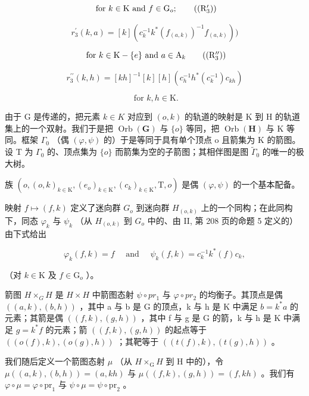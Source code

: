 \[
\text { for } k \in \mathrm{K} \text { and } f \in \mathrm{G} _ {o};\tag{\((\mathrm{R}_{3}^{\prime})\)}
\]

\[
r _ {3} ^ {\prime} (k, a) = [ k ] (c _ {k} ^ {- 1} k ^ {*} (f _ {(a, k)}) ^ {- 1} f _ {(a, k)}))
\]

\[
\text { for } k \in \mathrm{K} - \{e \} \text { and } a \in \mathrm{A} _{k}\tag{\((\mathrm{R}_{3}^{\prime\prime})\)}
\]

\[
r _ {3} ^ {\prime \prime} (k, h) = [ k h ] ^ {- 1} [ k ] [ h ] (c _ {h} ^ {- 1} h ^ {*} (c _ {k} ^ {- 1}) c _ {k h})
\]

\[
\text { for } k,h \in \mathrm{K}.
\]

由于 G 是传递的，把元素 \(k \in K\) 对应到 \((o, k)\) 的轨道的映射是 K 到 H 的轨道集上的一个双射。我们于是把 \(\operatorname{Orb}(\mathbf{G})\) 与 \(\{o\}\) 等同，把 \(\operatorname{Orb}(\mathbf{H})\) 与 K 等同。框架 \(\Gamma_{0}\) （偶 \((\varphi, \psi)\) 的）于是等同于具有单个顶点 o 且箭集为 K 的箭图。设 T 为 \(\Gamma_{0}\) 的、顶点集为 \(\{o\}\) 而箭集为空的子箭图；其相伴图是图 \(\widetilde{\Gamma}_{0}\) 的唯一的极大树。

族 \((o,(o,k)_{k\in \mathrm{K}},(e_o)_{k\in \mathrm{K}},(c_k)_{k\in \mathrm{K}},\mathrm{T},o)\) 是偶 \((\varphi ,\psi)\) 的一个基本配备。

映射 \(f \mapsto (f, k)\) 定义了迷向群 \(G_o\) 到迷向群 \(H_{(o,k)}\) 上的一个同构；在此同构下，同态 \(\varphi_k\) 与 \(\psi_k\) （从 \(H_{(o,k)}\) 到 \(G_o\) 中的、由 II, 第 208 页的命题 5 定义的）由下式给出

\[
\varphi_ {k} (f, k) = f \quad \text { and } \quad \psi_ {k} (f, k) = c _ {k} ^ {- 1} k ^ {*} (f) c _ {k},\tag{3}
\]

（对 \(k\in \mathrm{K}\) 及 \(f\in \mathrm{G}_o\) ）。

箭图 \(H \times_{G} H\) 是 \(H \times H\) 中箭图态射 \(\psi \circ pr_{1}\) 与 \(\varphi \circ pr_{2}\) 的均衡子。其顶点是偶 \(((a, k), (b, h))\) ，其中 a 与 b 是 G 的顶点，k 与 h 是 K 中满足 \(b = k^{*}a\) 的元素；其箭是偶 \(((f, k), (g, h))\) ，其中 f 与 g 是 G 的箭，k 与 h 是 K 中满足 \(g = k^{*}f\) 的元素；箭 \(((f,k),(g,h))\) 的起点等于 \(((o(f),k),(o(g),h))\) ；其靶等于 \(((t(f),k),(t(g),h))\) 。

我们随后定义一个箭图态射 \(\mu\) （从 \(H \times_{\mathrm{G}} H\) 到 H 中的），令 \(\mu((a,k),(b,h)) = (a,kh)\) 与 \(\mu((f,k),(g,h)) = (f,kh)\) 。我们有 \(\varphi \circ \mu = \varphi \circ \mathrm{pr}_1\) 与 \(\psi \circ \mu = \psi \circ \mathrm{pr}_2\) 。

